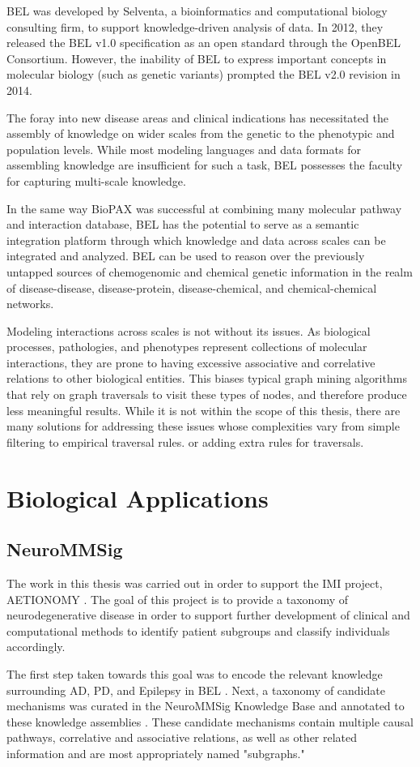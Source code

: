 BEL was developed by Selventa, a bioinformatics and computational biology consulting firm, to support knowledge-driven analysis of data. In 2012, they released the \ac{BEL} v1.0 specification as an open standard through the OpenBEL Consortium. However, the inability of BEL to express important concepts in molecular biology (such as genetic variants) prompted the \ac{BEL} v2.0 revision in 2014.

The foray into new disease areas and clinical indications has necessitated the assembly of knowledge on wider scales from the genetic to the phenotypic and population levels. While most modeling languages and data formats for assembling knowledge are insufficient for such a task, BEL possesses the faculty for capturing multi-scale knowledge. 

In the same way \ac{BioPAX} was successful at combining many molecular pathway and interaction database, \ac{BEL} has the potential to serve as a semantic integration platform through which knowledge and data across scales can be integrated and analyzed. \ac{BEL} can be used to reason over the previously untapped sources of chemogenomic and chemical genetic information in the realm of disease-disease, disease-protein, disease-chemical, and chemical-chemical networks.

Modeling interactions across scales is not without its issues. As biological processes, pathologies, and phenotypes represent collections of molecular interactions, they are prone to having excessive associative and correlative relations to other biological entities. This biases typical graph mining algorithms that rely on  graph traversals to visit these types of nodes, and therefore produce less meaningful results. While it is not within the scope of this thesis, there are many solutions for addressing these issues whose complexities vary from simple filtering to empirical traversal rules. or adding extra rules for traversals.

\section{Biological Applications}
\label{biological_applications}

\subsection{NeuroMMSig}

The work in this thesis was carried out in order to support the \ac{IMI} \cite{imisite} project, AETIONOMY \cite{aetionomy}. The goal of this project is to provide a taxonomy of neurodegenerative disease in order to support further development of clinical and computational methods to identify patient subgroups and classify individuals accordingly. 

The first step taken towards this goal was to encode the relevant knowledge surrounding \ac{AD}, \ac{PD}, and Epilepsy in BEL \cite{Kodamullil2015}. Next, a taxonomy of candidate mechanisms was curated in the \ac{NeuroMMSig} Knowledge Base and annotated to these knowledge assemblies \cite{Domingo-Fernandez2017}. These candidate mechanisms contain multiple causal pathways, correlative and associative relations, as well as other related information and are most appropriately named "subgraphs."
